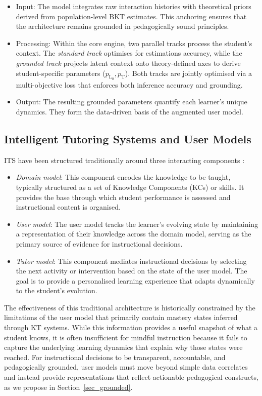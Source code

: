 \documentclass[runningheads]{llncs}
\begin{document}
\begin{itemize}
  \item Input: The model integrates raw interaction histories with theoretical priors derived from population-level BKT estimates. This anchoring ensures that the architecture remains grounded in pedagogically sound principles.
  \item Processing: Within the core engine, two parallel tracks process the student's context. The \textit{standard track} optimises for estimations accuracy, while the \textit{grounded track} projects latent context onto theory-defined axes to derive student-specific parameters ($p_{\text{L}_0}, p_{\text{T}}$). Both tracks are jointly optimised via a multi-objective loss that enforces both inference accuracy and grounding.
  \item Output: The resulting grounded parameters quantify each learner's unique dynamics. They form the data-driven basis of the augmented user model.
\end{itemize}


\subsection{Intelligent Tutoring Systems and User Models}
\label{sub_its}

ITS have been structured traditionally around three interacting components \cite{nkambou2010advances}:

\begin{itemize}
    \item \textit{Domain model}: This component encodes the knowledge to be taught, typically structured as a set of Knowledge Components (KCs) or skills. It provides the base through which student performance is assessed and instructional content is organised.
    \item \textit{User model}: The user model tracks the learner's evolving state by maintaining a representation of their knowledge across the domain model, serving as the primary source of evidence for instructional decisions. 
    \item \textit{Tutor model}: This component mediates instructional decisions by selecting the next activity or intervention based on the state of the user model. The goal is to provide a personalised learning experience that adapts dynamically to the student's evolution.
\end{itemize}

The effectiveness of this traditional architecture is historically constrained by the limitations of the user model that primarily contain mastery states inferred through KT systems. While this information provides a useful snapshot of what a student knows, it is often insufficient for mindful instruction because it fails to capture the underlying learning dynamics that explain why those states were reached. For instructional decisions to be transparent, accountable, and pedagogically grounded, user models must move beyond simple data correlates and instead provide representations that reflect actionable pedagogical constructs, as we propose in Section~\ref{sec_grounded}.
\end{document}
